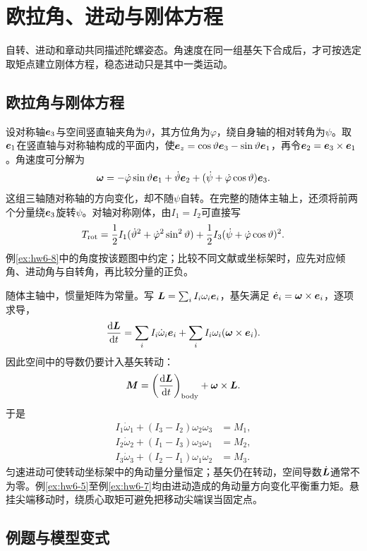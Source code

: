 \section{欧拉角、进动与刚体方程}

自转、进动和章动共同描述陀螺姿态。角速度在同一组基矢下合成后，才可按选定取矩点建立刚体方程，稳态进动只是其中一类运动。



\subsection{欧拉角与刚体方程}
\label{sec:complete6-euler}
设对称轴$\bm{e}_3$与空间竖直轴夹角为$\vartheta$，其方位角为$\varphi$，绕自身轴的相对转角为$\psi$。取$\bm{e}_1$在竖直轴与对称轴构成的平面内，使$\bm{e}_z=\cos\vartheta\bm{e}_3-\sin\vartheta\bm{e}_1$，再令$\bm{e}_2=\bm{e}_3\times\bm{e}_1$。角速度可分解为
\[
 \bm{\omega}=-\dot\varphi\sin\vartheta\bm{e}_1
 +\dot\vartheta\bm{e}_2
 +(\dot\psi+\dot\varphi\cos\vartheta)\bm{e}_3.
\]
这组三轴随对称轴的方向变化，却不随$\psi$自转。在完整的随体主轴上，还须将前两个分量绕$\bm{e}_3$旋转$\psi$。对轴对称刚体，由$I_1=I_2$可直接写
\[
 T_{\rm rot}=\frac12I_1(\dot\vartheta^2+\dot\varphi^2\sin^2\vartheta)
 +\frac12I_3(\dot\psi+\dot\varphi\cos\vartheta)^2.
\]
例\ref{ex:hw6-8}中的角度按该题图中约定；比较不同文献或坐标架时，应先对应倾角、进动角与自转角，再比较分量的正负。

随体主轴中，惯量矩阵为常量。写 $\bm{L}=\sum_i I_i\omega_i\bm{e}_i$，基矢满足 $\dot{\bm{e}}_i=\bm{\omega}\times\bm{e}_i$，逐项求导，
\[
\frac{\mathop{}\!\mathrm d\bm{L}}{\mathop{}\!\mathrm d t}
=\sum_i I_i\dot\omega_i\bm{e}_i
+\sum_i I_i\omega_i(\bm{\omega}\times\bm{e}_i).
\]
因此空间中的导数仍要计入基矢转动：
\[
 \bm{M}=\left(\frac{\mathop{}\!\mathrm d\bm{L}}{\mathop{}\!\mathrm d t}\right)_{\rm body}
 +\bm{\omega}\times\bm{L}.
\]
于是
\[
 \begin{aligned}
 I_1\dot\omega_1+(I_3-I_2)\omega_2\omega_3&=M_1,\\
 I_2\dot\omega_2+(I_1-I_3)\omega_3\omega_1&=M_2,\\
 I_3\dot\omega_3+(I_2-I_1)\omega_1\omega_2&=M_3.
 \end{aligned}
\]
匀速进动可使转动坐标架中的角动量分量恒定；基矢仍在转动，空间导数$\dot{\bm{L}}$通常不为零。例\ref{ex:hw6-5}至例\ref{ex:hw6-7}均由进动造成的角动量方向变化平衡重力矩。悬挂尖端移动时，绕质心取矩可避免把移动尖端误当固定点。


\subsection{例题与模型变式}

